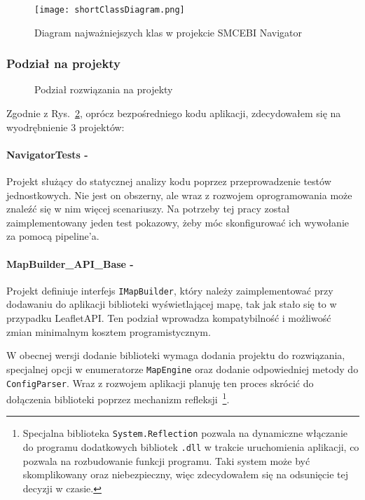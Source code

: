 
\begin{figure}[!hb]
    \centering
    \texttt{[image: shortClassDiagram.png]}
    \caption{Diagram najważniejszych klas w projekcie SMCEBI Navigator}
    \label{img:shortClassDiagram}
\end{figure}

\subsubsection{Podział na projekty}
\begin{figure}[!ht]
    \centering
    \caption{Podział rozwiązania na projekty}
    \label{img:projectDiagram}
\end{figure}

\newpage
\restoregeometry

Zgodnie z Rys.~\ref{img:projectDiagram}, oprócz bezpośredniego kodu aplikacji, 
zdecydowałem się na wyodrębnienie 3 projektów:

\paragraph{NavigatorTests -}
Projekt służący do statycznej analizy kodu poprzez prze\-pro\-wa\-dze\-nie testów jednostkowych.
Nie jest on obszerny, ale wraz z rozwojem oprogramowania może znaleźć się w nim więcej 
scenariuszy. Na potrzeby tej pracy został zaimplementowany jeden test pokazowy, 
żeby móc skonfigurować ich wywołanie za pomocą pipeline'a.

\paragraph{MapBuilder\_API\_Base -}
Projekt definiuje interfejs \verb|IMapBuilder|, który należy zaimplementować przy dodawaniu 
do aplikacji biblioteki wyświetlającej mapę, tak jak stało się to w przypadku LeafletAPI.
Ten podział wprowadza kompatybilność i możliwość zmian minimalnym kosztem programistycznym.

W obecnej wersji dodanie biblioteki wymaga dodania projektu do rozwiązania, specjalnej opcji w enumeratorze 
\verb|MapEngine| oraz dodanie odpowiedniej metody do \verb|ConfigParser|. Wraz z rozwojem aplikacji 
planuję ten proces skrócić do dołączenia biblioteki poprzez mechanizm refleksji~\cprotect\footnote{%
    Specjalna biblioteka \verb|System.Reflection| pozwala na dynamiczne włączanie do programu 
    dodatkowych bibliotek \verb|.dll| w trakcie uruchomienia aplikacji, co pozwala na rozbudowanie 
    funkcji programu. Taki system może być skomplikowany oraz niebezpieczny, więc zdecydowałem się 
    na odsunięcie tej decyzji w czasie.
}.

